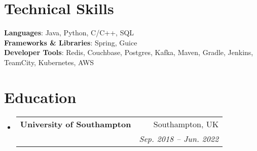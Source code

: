 \documentclass[letterpaper,11pt]{article}
\makeatletter
\newcommand{\resumeSubheading}[4]{
  \vspace{-2pt}\item
    \begin{tabular*}{0.97\textwidth}[t]{l@{\extracolsep{\fill}}r}
      \textbf{#1} & #2 \\
      \textit{\textbf{\small#3}} & \textit{\small #4} \\
    \end{tabular*}\vspace{-7pt}
}
\newcommand{\resumeSubHeadingListStart}{\begin{itemize}[leftmargin=0.15in, label={}]}
\newcommand{\resumeSubHeadingListEnd}{\end{itemize}}
\makeatother
\begin{document}
%
\section{Technical Skills}
 \begin{itemize}[leftmargin=0.15in, label={}]
    \small{\item{
     \textbf{Languages}{: Java, Python, C/C++, SQL} \\
     \textbf{Frameworks \& Libraries}{: Spring, Guice} \\
     \textbf{Developer Tools}{: Redis, Couchbase, Postgres, Kafka, Maven, Gradle, Jenkins, TeamCity, Kubernetes, AWS} \\
    }}
 \end{itemize}

\section{Education}
  \resumeSubHeadingListStart
    \resumeSubheading
      {University of Southampton}{Southampton, UK}
      {\normalfont{\textit{MEng Aerospace \& Astronautics, Upper Second Class Honours}}}{Sep. 2018 -- Jun. 2022}
  \resumeSubHeadingListEnd


\end{document}
